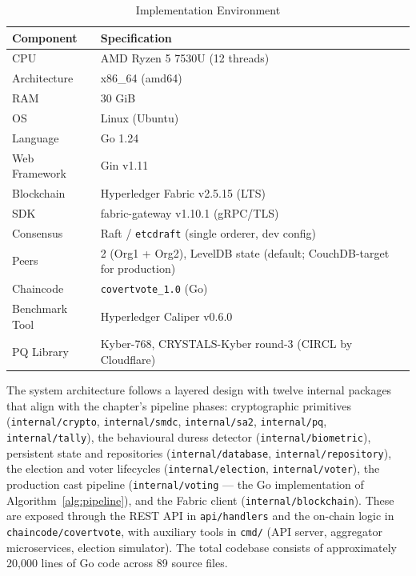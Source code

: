 \begin{table}[H]
\centering
\caption{Implementation Environment}
\label{tab:impl-env}
\begin{tabular}{|l|l|}
\hline
\textbf{Component} & \textbf{Specification} \\
\hline
CPU & AMD Ryzen 5 7530U (12 threads) \\
\hline
Architecture & x86\_64 (amd64) \\
\hline
RAM & 30 GiB \\
\hline
OS & Linux (Ubuntu) \\
\hline
Language & Go 1.24 \\
\hline
Web Framework & Gin v1.11 \\
\hline
Blockchain & Hyperledger Fabric v2.5.15 (LTS) \\
\hline
SDK & fabric-gateway v1.10.1 (gRPC/TLS) \\
\hline
Consensus & Raft / \texttt{etcdraft} (single orderer, dev config) \\
\hline
Peers & 2 (Org1 + Org2), LevelDB state (default; CouchDB-target for production) \\
\hline
Chaincode & \texttt{covertvote\_1.0} (Go) \\
\hline
Benchmark Tool & Hyperledger Caliper v0.6.0~\cite{caliper} \\
\hline
PQ Library & Kyber-768, CRYSTALS-Kyber round-3 (CIRCL by Cloudflare)~\cite{circl} \\
\hline
\end{tabular}
\end{table}

The system architecture follows a layered design with twelve internal packages that align with the chapter's pipeline phases: cryptographic primitives (\texttt{internal/crypto}, \texttt{internal/smdc}, \texttt{internal/sa2}, \texttt{internal/pq}, \texttt{internal/tally}), the behavioural duress detector (\texttt{internal/biometric}), persistent state and repositories (\texttt{internal/database}, \texttt{internal/repository}), the election and voter lifecycles (\texttt{internal/election}, \texttt{internal/voter}), the production cast pipeline (\texttt{internal/voting} --- the Go implementation of Algorithm~\ref{alg:pipeline}), and the Fabric client (\texttt{internal/blockchain}). These are exposed through the REST API in \texttt{api/handlers} and the on-chain logic in \texttt{chaincode/covertvote}, with auxiliary tools in \texttt{cmd/} (API server, aggregator microservices, election simulator). The total codebase consists of approximately 20{,}000 lines of Go code across 89 source files.


